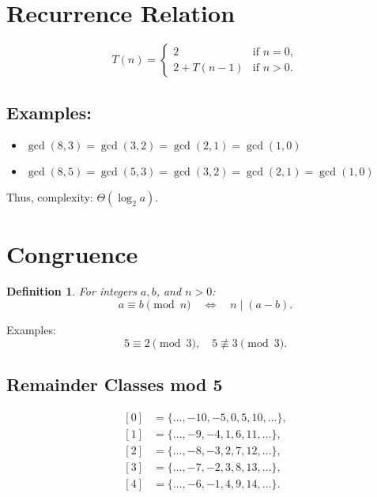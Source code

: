 \documentclass[hidelinks]{article}
\theoremstyle{mystyle}
\newtheorem{definition}{Definition}[section]
\begin{document}
\section{Recurrence Relation}

\[
T(n) =
\begin{cases}
	2 & \text{if } n = 0, \\
	2 + T(n-1) & \text{if } n > 0.
\end{cases}
\]

\begin{figure}[!ht]
\centering
{}%

\label{fig:my_label}
\end{figure}

\subsection*{Examples:}
\begin{itemize}
    \item $\gcd(8, 3) = \gcd(3, 2) = \gcd(2, 1) = \gcd(1, 0)$
    \item $\gcd(8, 5) = \gcd(5, 3) = \gcd(3, 2) = \gcd(2, 1) = \gcd(1, 0)$
\end{itemize}

Thus, complexity: $\Theta(\log_2 a)$.
\section{Congruence}
\begin{definition}
For integers $a, b$, and $n > 0$:
\[
a \equiv b \pmod{n} \quad \iff \quad n \mid (a - b).
\]
\end{definition}

Examples:
\[
5 \equiv 2 \pmod{3}, \quad 5 \not\equiv 3 \pmod{3}.
\]

\subsection*{Remainder Classes mod 5}
\[
\begin{aligned}
[0] &= \{\dots, -10, -5, 0, 5, 10, \dots\}, \\
[1] &= \{\dots, -9, -4, 1, 6, 11, \dots\}, \\
[2] &= \{\dots, -8, -3, 2, 7, 12, \dots\}, \\
[3] &= \{\dots, -7, -2, 3, 8, 13, \dots\}, \\
[4] &= \{\dots, -6, -1, 4, 9, 14, \dots\}.
\end{aligned}
\]
\end{document}
